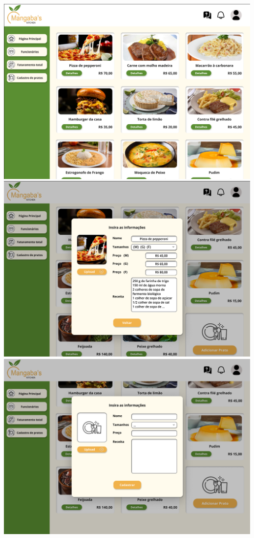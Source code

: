\begin{center}
    \includegraphics[width=1\textwidth]{imagens-template/Layout_Gerente_2651.png} 
    \includegraphics[width=1\textwidth]{imagens-template/Layout_Gerente_2649.png} 
    \includegraphics[width=1\textwidth]{imagens-template/Layout_Gerente_2647.png} 
    \newpage
\end{center}
